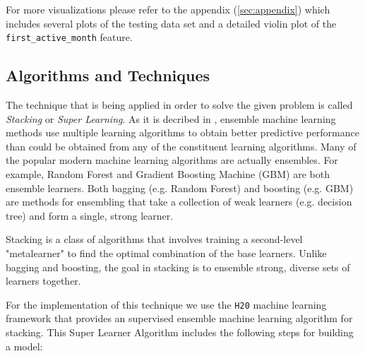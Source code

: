 \documentclass{article}
\begin{document}
For more visualizations please refer to the appendix (\ref{sec:appendix}) which includes several plots of the testing data set and a detailed violin plot of the \texttt{first\_active\_month} feature.

\newpage

\subsection{Algorithms and Techniques}


The technique that is being applied in order to solve the given problem is called \textit{Stacking} or \textit{Super Learning}. As it is decribed in \cite{h2o}, ensemble machine learning methods use multiple learning algorithms to obtain better predictive performance than could be obtained from any of the constituent learning algorithms. Many of the popular modern machine learning algorithms are actually ensembles. For example, Random Forest and Gradient Boosting Machine (GBM) are both ensemble learners. Both bagging (e.g. Random Forest) and boosting (e.g. GBM) are methods for ensembling that take a collection of weak learners (e.g. decision tree) and form a single, strong learner.

Stacking is a class of algorithms that involves training a second-level "metalearner" to find the optimal combination of the base learners. Unlike bagging and boosting, the goal in stacking is to ensemble strong, diverse sets of learners together.

For the implementation of this technique we use the \texttt{H20} machine learning framework that provides an supervised ensemble machine learning algorithm for stacking. This Super Learner Algorithm includes the following steps for building a model:
\end{document}

